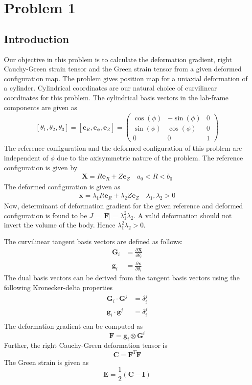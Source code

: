 \documentclass[../main.tex]{subfiles}
\begin{document}
\lstset{language=Matlab}
\chapter{Problem 1}
\section{Introduction} Our objective in this problem is to calculate
the deformation gradient, right Cauchy-Green strain tensor and the
Green strain tensor from a given deformed configuration map.  The
problem gives position map for a uniaxial deformation of a
cylinder. Cylindrical coordinates are our natural choice of
curvilinear coordinates for this problem. The cylindrical basis
vectors in the lab-frame components are given as
\begin{align*}
  \left[\theta_1,\theta_2,\theta_3\right]=\left[\mathbf{e}_R,\mathbf{e}_{\phi},\mathbf{e}_Z\right] =
  \begin{pmatrix}
    \cos(\phi) & -\sin(\phi) & 0\\
    \sin(\phi) & \cos(\phi) & 0\\
    0 & 0 & 1
  \end{pmatrix}
\end{align*}
The reference configuration and the deformed configuration of this
problem are independent of $\phi$ due to the axisymmetric nature of
the problem. The reference configuration is given by
\begin{align*}
  \mathbf{X} = R\mathbf{e}_R + Z\mathbf{e}_Z\quad a_0<R<b_0
\end{align*}
The deformed configuration is given as
\begin{align*}
  \mathbf{x} = \lambda_1R\mathbf{e}_R+\lambda_2Z\mathbf{e}_Z\quad \lambda_1,\lambda_2 > 0
\end{align*}
Now, determinant of deformation gradient for the given reference and
deformed configuration is found to be
$J = |\mathbf{F}| = \lambda_1^2\lambda_2$. A valid deformation should
not invert the volume of the body. Hence $\lambda_1^2\lambda_2 > 0$.

The curvilinear tangent basis vectors are defined as follows:
\begin{align*}
  \mathbf{G}_i &= \frac{\partial\mathbf{X}}{\partial\theta_i}\\
  \mathbf{g}_i &=\frac{\partial\mathbf{x}}{\partial\theta_i}
\end{align*}
The dual basis vectors can be derived from the tangent basis vectors
using the following Kronecker-delta properties
\begin{align*}
  \mathbf{G}_i\cdot\mathbf{G}^j &= \delta_i^j\\
  \mathbf{g}_i\cdot\mathbf{g}^j &= \delta_i^j\\
\end{align*}
The deformation gradient can be computed as
\[\mathbf{F} = \mathbf{g}_i\otimes\mathbf{G}^i\]
Further, the right Cauchy-Green deformation tensor is
\[\mathbf{C}=\mathbf{F}^T\mathbf{F} \]
The Green strain is given as
\[\mathbf{E}= \frac{1}{2}(\mathbf{C}-\mathbf{I})\]
\end{document}

